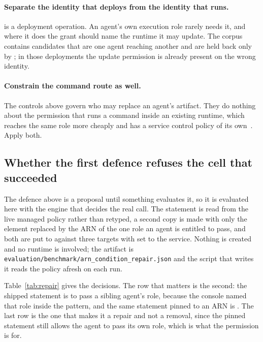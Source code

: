 \paragraph{Separate the identity that deploys from the identity that runs.}
 is a deployment operation. An agent's own execution
role rarely needs it, and where it does the grant should name the runtime it
may update. The corpus contains \nBlockedAgentToAgent candidates that are one
agent reaching another and are held back only by ; in those
deployments the update permission is already present on the wrong identity.

\paragraph{Constrain the command route as well.}
The controls above govern who may replace an agent's artifact. They do nothing
about the permission that runs a command inside an existing runtime, which
reaches the same role more cheaply and has a service control policy of its
own~\cite{garcia2026agentcorepaths}. Apply both.

\subsection{Whether the first defence refuses the cell that succeeded}
\label{sec:arn-repair}

The defence above is a proposal until something evaluates it, so it is
evaluated here with the engine that decides the real call. The
 statement is read from the live managed policy rather than
retyped, a second copy is made with only the  element replaced
by the ARN of the one role an agent is entitled to pass, and both are put to
 against three targets with
 set to the service. Nothing is created and no
runtime is involved; the artifact is
\texttt{evaluation/\allowbreak benchmark/\allowbreak arn\_condition\_repair.json}
and the script that writes it reads the policy afresh on each run.

Table~\ref{tab:repair} gives the \nRepairDecisions decisions. The row that
matters is the second: the shipped statement is \repairShippedSibling{} to
pass a sibling agent's role, because the console named that role inside the
pattern, and the same statement pinned to an ARN is \repairPinnedSibling. The
last row is the one that makes it a repair and not a removal, since the
pinned statement still allows the agent to pass its own role, which is what
the permission is for.

